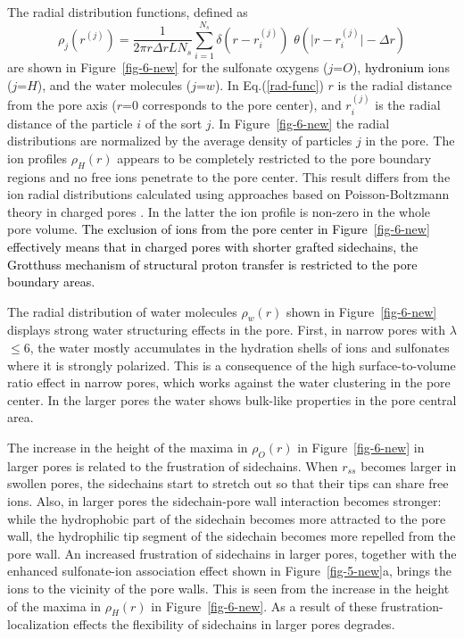 \documentclass[3p,english,preprint]{elsarticle}
\newcommand{\need}[1]{\textcolor{black}{#1}}
\newcommand{\mage}[1]{\textcolor{black}{#1}}
\begin{document}
The radial distribution functions, defined as  
\begin{equation}
\rho_j(r^{(j)}) =
\frac{1}{2 \pi r \Delta r L  N_s}
\displaystyle\sum_{i=1}^{N_s} \delta{\left( r - r_i^{(j)} \right)} 
\,\, \theta \left( \vert  r -   r_i^{(j)} \vert  - \Delta r\right)
\label{rad-func}
\end{equation}
are shown in Figure~\ref{fig-6-new} for  
the sulfonate oxygens ($j$=$O$), 
{\need{ 
 hydronium 
}}
ions ($j$=$H$), and the water molecules ($j$=$w$). 
In Eq.(\ref{rad-func}) $r$ is the radial distance from the pore axis
 ($r$=0 corresponds to the pore center), 
and $r_i^{(j)}$ is the radial distance of the particle $i$ of the sort $j$. 
In Figure~\ref{fig-6-new} the radial distributions are normalized by the average density of 
particles $j$ in the pore. 
The ion profiles $\rho_H(r)$ appears to be completely restricted to 
the pore boundary regions and no free ions penetrate to the pore center. 
This result differs from the ion radial distributions calculated  
using approaches based on  Poisson-Boltzmann theory  in  
charged pores \cite{eikerling-kornyshev-2001,yang-pintauro-2004,pintauro-1995}. In the latter 
the ion profile is non-zero in the whole pore volume. 
{\need{ 
The exclusion of ions from the pore center in  Figure~\ref{fig-6-new} effectively means that 
in charged pores with shorter grafted  sidechains,  the 
Grotthuss  mechanism of structural proton transfer is restricted to the
pore boundary areas. 
}}

The radial distribution of water molecules $\rho_w(r)$ 
shown in Figure~\ref{fig-6-new} displays strong water structuring effects in the pore.
 First, in narrow pores with $\lambda$$\leq$6, the water  
 mostly accumulates in the hydration shells of ions and sulfonates 
where it is strongly polarized. This is a consequence of the high
 surface-to-volume ratio effect in narrow pores, which works against 
the water clustering in the pore center.
 In the larger pores the water shows bulk-like properties in the pore central area. 


The increase in the height of the maxima in 
$\rho_O(r)$ in Figure~\ref{fig-6-new} in larger pores 
 is related to the frustration of sidechains. 
When $r_{ss}$ becomes larger in swollen pores, 
the sidechains start to stretch out so that  their tips 
can  share free ions.   
Also, in larger pores the sidechain-pore wall interaction becomes stronger:  
while the hydrophobic part of the sidechain becomes  more attracted to the pore wall, 
the hydrophilic tip segment of the sidechain becomes more repelled from the  pore wall.  
An increased frustration of sidechains in larger pores, together with the 
enhanced sulfonate-ion association effect shown in Figure~\ref{fig-5-new}a, brings the 
ions to the vicinity of the pore walls. This is seen from the increase 
in the height of the 
maxima in  $\rho_H(r)$   in Figure~\ref{fig-6-new}. 
As a result of these frustration-localization effects the 
flexibility of sidechains in larger pores degrades.   
\end{document}
